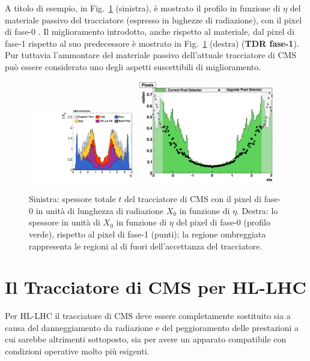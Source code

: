 A titolo di esempio, in Fig.~\ref{fig:CMSTkMB} (sinistra), \`e mostrato il profilo in funzione di $\eta$ del materiale passivo del tracciatore (espresso in lughezze di radiazione), con il pixel di fase-0 \cite{Chatrchyan:2014fea}. Il miglioramento introdotto, anche rispetto al materiale, dal pixel di fase-1 rispetto al suo predecessore \`e mostrato in Fig.~\ref{fig:CMSTkMB} (destra) ({\bf TDR fase-1}). Pur tuttavia l'ammontare del materiale passivo dell'attuale tracciatore di CMS pu\`o essere considerato uno degli aspetti suscettibili di miglioramento.
\begin{figure}
\centering
\includegraphics[width=0.42\textwidth]{Immagini/Tracker_SubDetectors_x_vs_eta.pdf}
\hfill
\includegraphics[width=0.53\textwidth]{Immagini/CMSPXL_ph0ph1_MB.PNG}
\caption{Sinistra: spessore totale $t$ del tracciatore di CMS con il pixel di fase-0 in unit\`a di lunghezza di radiazione $X_0$ in funzione di $\eta$. Destra: lo spessore in unit\`a di $X_0$ in funzione di $\eta$ del pixel di fase-0 (profilo verde), rispetto al pixel di fase-1 (punti); la regione ombreggiata rappresenta le regioni al di fuori dell'accettanza del tracciatore.}
\label{fig:CMSTkMB}
\end{figure}


\section{Il Tracciatore di CMS per HL-LHC}

Per HL-LHC il tracciatore di CMS deve essere completamente sostituito sia a causa del danneggiamento da radiazione e del peggioramento delle prestazioni a cui sarebbe altrimenti sottoposto, sia per avere un apparato compatibile con condizioni operative molto pi\`u esigenti\cite{CMSCollaboration:2015zni,Butler:2055167}. 

